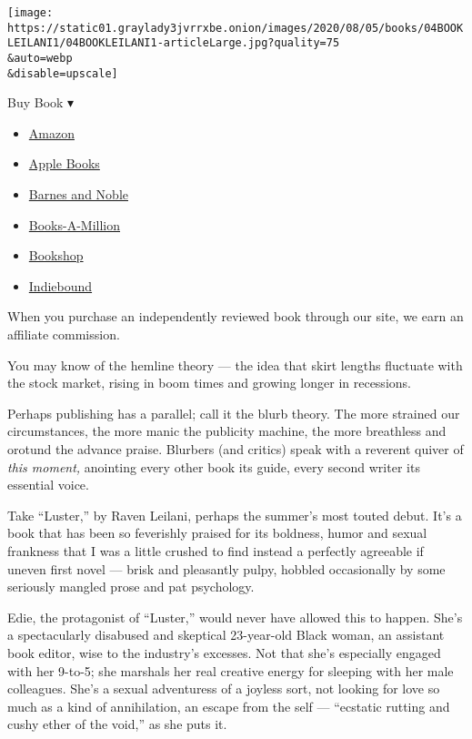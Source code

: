 \texttt{[image: https://static01.graylady3jvrrxbe.onion/images/2020/08/05/books/04BOOKLEILANI1/04BOOKLEILANI1-articleLarge.jpg?quality=75\\\&auto=webp\\\&disable=upscale]}

Buy Book ▾

\begin{itemize}
\tightlist
\item
  \href{https://www.amazon.com/gp/search?index=books\&tag=NYTBSREV-20\&field-keywords=Luster+Raven+Leilani}{Amazon}
\item
  \href{https://du-gae-books-dot-nyt-du-prd.appspot.com/buy?title=Luster\&author=Raven+Leilani}{Apple
  Books}
\item
  \href{https://www.anrdoezrs.net/click-7990613-11819508?url=https\%3A\%2F\%2Fwww.barnesandnoble.com\%2Fw\%2F\%3Fean\%3D9780374194321}{Barnes
  and Noble}
\item
  \href{https://www.anrdoezrs.net/click-7990613-35140?url=https\%3A\%2F\%2Fwww.booksamillion.com\%2Fp\%2FLuster\%2FRaven\%2BLeilani\%2F9780374194321}{Books-A-Million}
\item
  \href{https://bookshop.org/a/3546/9780374194321}{Bookshop}
\item
  \href{https://www.indiebound.org/book/9780374194321?aff=NYT}{Indiebound}
\end{itemize}

When you purchase an independently reviewed book through our site, we
earn an affiliate commission.

You may know of the hemline theory --- the idea that skirt lengths
fluctuate with the stock market, rising in boom times and growing longer
in recessions.

Perhaps publishing has a parallel; call it the blurb theory. The more
strained our circumstances, the more manic the publicity machine, the
more breathless and orotund the advance praise. Blurbers (and critics)
speak with a reverent quiver of \emph{this moment,} anointing every
other book its guide, every second writer its essential voice.

Take ``Luster,'' by Raven Leilani, perhaps the summer's most touted
debut. It's a book that has been so feverishly praised for its boldness,
humor and sexual frankness that I was a little crushed to find instead a
perfectly agreeable if uneven first novel --- brisk and pleasantly
pulpy, hobbled occasionally by some seriously mangled prose and pat
psychology.

Edie, the protagonist of ``Luster,'' would never have allowed this to
happen. She's a spectacularly disabused and skeptical 23-year-old Black
woman, an assistant book editor, wise to the industry's excesses. Not
that she's especially engaged with her 9-to-5; she marshals her real
creative energy for sleeping with her male colleagues. She's a sexual
adventuress of a joyless sort, not looking for love so much as a kind of
annihilation, an escape from the self --- ``ecstatic rutting and cushy
ether of the void,'' as she puts it.

